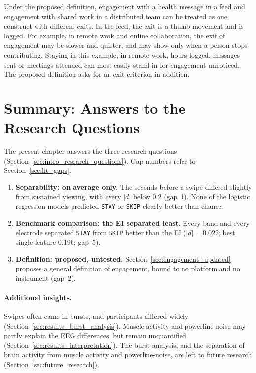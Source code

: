 \documentclass[12pt,a4paper]{report}
\begin{document}
Under the proposed definition, engagement with a health message in a feed and engagement with shared work in a distributed team can be treated as one construct with different exits. In the feed, the exit is a thumb movement and is logged. For example, in remote work and online collaboration, the exit of engagement may be slower and quieter, and may show only when a person stops contributing. Staying in this example, in remote work, hours logged, messages sent or meetings attended can most easily stand in for engagement unnoticed. The proposed definition asks for an exit criterion in addition.

\section{Summary: Answers to the Research Questions}
\label{sec:results_conclusion}
The present chapter answers the three research questions (Section~\ref{sec:intro_research_questions}). Gap numbers refer to Section~\ref{sec:lit_gaps}.
\begin{enumerate}
    \item \textbf{Separability: on average only.} The seconds before a swipe differed slightly from sustained viewing, with every \(|d|\) below 0.2 (gap~1). None of the logistic regression models predicted \texttt{STAY} or \texttt{SKIP} clearly better than chance.
    \item \textbf{Benchmark comparison: the EI separated least.} Every band and every electrode separated \texttt{STAY} from \texttt{SKIP} better than the EI (\(|d| = 0.022\); best single feature 0.196; gap~5).
    \item \textbf{Definition: proposed, untested.} Section~\ref{sec:engagement_updated} proposes a general definition of engagement, bound to no platform and no instrument (gap~2).
\end{enumerate}

\paragraph{Additional insights.} Swipes often came in bursts, and participants differed widely (Section~\ref{sec:results_burst_analysis}). Muscle activity and powerline-noise may partly explain the EEG differences, but remain unquantified (Section~\ref{sec:results_interpretation}). The burst analysis, and the separation of brain activity from muscle activity and powerline-noise, are left to future research (Section~\ref{sec:future_research}).
\end{document}
